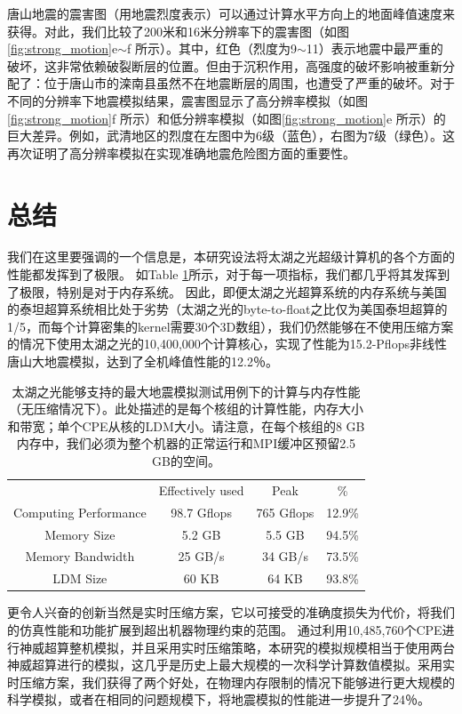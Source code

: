 \documentclass[degree=doctor]{thuthesis}
\begin{document}
唐山地震的震害图（用地震烈度表示）可以通过计算水平方向上的地面峰值速度来获得。对此，我们比较了200米和16米分辨率下的震害图（如图\ref{fig:strong_motion}e$\sim$f 所示）。其中，红色（烈度为9$\sim$11）表示地震中最严重的破坏，这非常依赖破裂断层的位置。但由于沉积作用，高强度的破坏影响被重新分配了：位于唐山市的滦南县虽然不在地震断层的周围，也遭受了严重的破坏。对于不同的分辨率下地震模拟结果，震害图显示了高分辨率模拟（如图\ref{fig:strong_motion}f 所示）和低分辨率模拟（如图\ref{fig:strong_motion}e 所示）的巨大差异。例如，武清地区的烈度在左图中为6级（蓝色），右图为7级（绿色）。这再次证明了高分辨率模拟在实现准确地震危险图方面的重要性。

\section{总结}

我们在这里要强调的一个信息是，本研究设法将太湖之光超级计算机的各个方面的性能都发挥到了极限。 如Table \ref{tb:push-limit}所示，对于每一项指标，我们都几乎将其发挥到了极限，特别是对于内存系统。 因此，即便太湖之光超算系统的内存系统与美国的泰坦超算系统相比处于劣势（太湖之光的byte-to-float之比仅为美国泰坦超算的1/5，而每个计算密集的kernel需要30个3D数组），我们仍然能够在不使用压缩方案的情况下使用太湖之光的10,400,000个计算核心，实现了性能为15.2-Pflops非线性唐山大地震模拟，达到了全机峰值性能的12.2％。

\begin{table}[!t]
\caption{
太湖之光能够支持的最大地震模拟测试用例下的计算与内存性能（无压缩情况下）。此处描述的是每个核组的计算性能，内存大小和带宽；单个CPE从核的LDM大小。请注意，在每个核组的8 GB内存中，我们必须为整个机器的正常运行和MPI缓冲区预留2.5 GB的空间。}
\label{tb:push-limit}
\centering
\begin{tabular}{cccc}
\hline\hline
  & Effectively used & Peak & \% \\

  Computing Performance & 98.7 Gflops & 765 Gflops & 12.9\% \\
  Memory Size & 5.2 GB & 5.5 GB & 94.5\% \\
  Memory Bandwidth & 25 GB/s & 34 GB/s & 73.5\% \\
  LDM Size & 60 KB & 64 KB & 93.8\% \\\hline
\hline
\end{tabular}
\end{table}

更令人兴奋的创新当然是实时压缩方案，它以可接受的准确度损失为代价，将我们的仿真性能和功能扩展到超出机器物理约束的范围。 通过利用10,485,760个CPE进行神威超算整机模拟，并且采用实时压缩策略，本研究的模拟规模相当于使用两台神威超算进行的模拟，这几乎是历史上最大规模的一次科学计算数值模拟。采用实时压缩方案，我们获得了两个好处，在物理内存限制的情况下能够进行更大规模的科学模拟，或者在相同的问题规模下，将地震模拟的性能进一步提升了24％。
\end{document}
